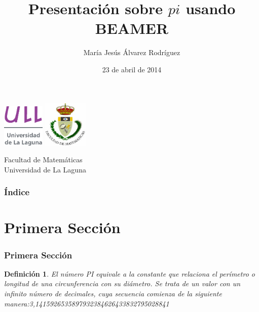 \documentclass{beamer}
\title[Presentación con Beamer]{Presentación sobre $pi$ usando BEAMER}
\author[María Jesús]{María Jesús Álvarez Rodríguez}
\date[23-04-2014]{23 de abril de 2014}
\newtheorem{definicion}{Definición}
\begin{document}
  
\begin{frame}

  \includegraphics[width=0.15\textwidth]{img/ullesc}
  \hspace*{7.0cm}
  \includegraphics[width=0.16\textwidth]{img/fmatesc}
  \titlepage

  \begin{small}
    \begin{center}
     Facultad de Matemáticas \\
     Universidad de La Laguna
    \end{center}
  \end{small}

\end{frame}

\begin{frame}
  \frametitle{Índice}  
  \tableofcontents[pausesections]
\end{frame}


\section{Primera Sección}


\begin{frame}

\frametitle{Primera Sección}

\begin{definicion}
El número PI equivale a la constante que relaciona el perímetro o longitud de una 
circunferencia con su diámetro. Se trata de un valor con un infinito número de decimales, cuya secuencia comienza de 
la siguiente manera:3,1415926535897932384626433832795028841

\end{definicion}

\end{frame}
\end{document}
